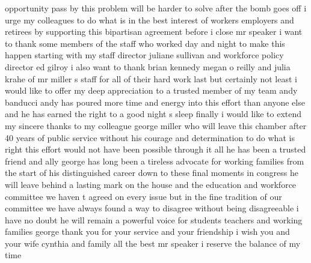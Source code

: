 \documentclass{article}
\begin{document}
opportunity pass by this problem will be harder to solve after the bomb goes off i urge my colleagues to do what is in the best interest of workers employers and retirees by supporting this bipartisan agreement before i close mr speaker i want to thank some members of the staff who worked day and night to make this happen starting with my staff director juliane sullivan and workforce policy director ed gilroy i also want to thank brian kennedy megan o reilly and julia krahe of mr miller s staff for all of their hard work last but certainly not least i would like to offer my deep appreciation to a trusted member of my team andy banducci andy has poured more time and energy into this effort than anyone else and he has earned the right to a good night s sleep finally i would like to extend my sincere thanks to my colleague george miller who will leave this chamber after 40 years of public service without his courage and determination to do what is right this effort would not have been possible through it all he has been a trusted friend and ally george has long been a tireless advocate for working families from the start of his distinguished career down to these final moments in congress he will leave behind a lasting mark on the house and the education and workforce committee we haven t agreed on every issue but in the fine tradition of our committee we have always found a way to disagree without being disagreeable i have no doubt he will remain a powerful voice for students teachers and working families george thank you for your service and your friendship i wish you and your wife cynthia and family all the best mr speaker i reserve the balance of my time
\vspace{8mm}
\end{document}
